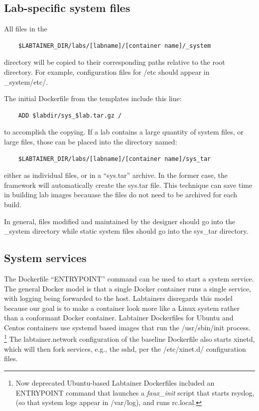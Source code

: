 \documentclass[12pt]{article}
\begin{document}
\subsection{Lab-specific system files}
All files in the
\begin{verbatim}
    $LABTAINER_DIR/labs/[labname]/[container name]/_system
\end{verbatim}
directory will be copied to their corresponding paths relative to the root directory.
For example, configuration files for /etc should appear in \_system/etc/.

The initial Dockerfile from the templates include this line:
\begin{verbatim}
    ADD $labdir/sys_$lab.tar.gz /
\end{verbatim}
\noindent to accomplish the copying. 
If a lab contains a large quantity of system files, or large files, those
can be placed into the directory named:
\begin{verbatim}
    $LABTAINER_DIR/labs/[labname]/[container name]/sys_tar
\end{verbatim}
either as individual files, or in a ``sys.tar'' archive.  In the former case,
the framework will automatically create the sys.tar file.  This technique 
can save time in building lab images becauase the files do not need to be 
archived for each build.  

In general, files modified and maintained by the designer should go into the
\_system directory while static system files should go into the sys\_tar directory.

\subsection {System services}
The Dockerfile ``ENTRYPOINT'' command can be used to start a system service.  The general Docker 
model is that a single Docker container runs a single service, with logging being forwarded to 
the host.  Labtainers disregards this model because our goal is to make a container look more like a Linux
system rather than a conformant Docker container.  Labtainer Dockerfiles for Ubuntu and Centos containers
use systemd based images that run the /usr/sbin/init process.  \footnote {Now deprecated Ubuntu-based Labtainer Dockerfiles included an
ENTRYPOINT command that launches a \textit{faux\_init} script that starts rsyslog, (so that system logs
appear in /var/log), and runs rc.local.}  The labtainer.network configuration of the baseline Dockerfile also starts xinetd,
which will then fork services, e.g., the sshd, per the /etc/xinet.d/ configuration files.  
\end{document}
